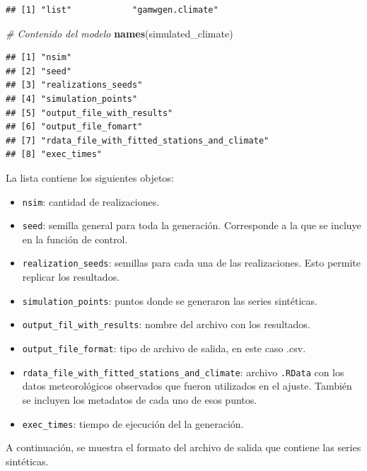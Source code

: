 \documentclass[
  12pt]{article}
\newenvironment{Shaded}{}{}
\newcommand{\CommentTok}[1]{\textcolor[rgb]{0.38,0.63,0.69}{\textit{#1}}}
\newcommand{\KeywordTok}[1]{\textcolor[rgb]{0.00,0.44,0.13}{\textbf{#1}}}
\newcommand{\NormalTok}[1]{#1}
\providecommand{\tightlist}{%
  \setlength{\itemsep}{0pt}\setlength{\parskip}{0pt}}
\begin{document}
\begin{verbatim}
## [1] "list"            "gamwgen.climate"
\end{verbatim}

\begin{Shaded}
\begin{Highlighting}[]
\CommentTok{# Contenido del modelo }
\KeywordTok{names}\NormalTok{(simulated_climate)}
\end{Highlighting}
\end{Shaded}

\begin{verbatim}
## [1] "nsim"                                       
## [2] "seed"                                       
## [3] "realizations_seeds"                         
## [4] "simulation_points"                          
## [5] "output_file_with_results"                   
## [6] "output_file_fomart"                         
## [7] "rdata_file_with_fitted_stations_and_climate"
## [8] "exec_times"
\end{verbatim}

La lista contiene los siguientes objetos:

\begin{itemize}
\tightlist
\item
  \texttt{nsim}: cantidad de realizaciones.
\item
  \texttt{seed}: semilla general para toda la generación. Corresponde a la que se incluye en la función de control.
\item
  \texttt{realization\_seeds}: semillas para cada una de las realizaciones. Esto permite replicar los resultados.
\item
  \texttt{simulation\_points}: puntos donde se generaron las series sintéticas.
\item
  \texttt{output\_fil\_with\_results}: nombre del archivo con los resultados.
\item
  \texttt{output\_file\_format}: tipo de archivo de salida, en este caso .csv.
\item
  \texttt{rdata\_file\_with\_fitted\_stations\_and\_climate}: archivo \texttt{.RData} con los datos meteorológicos observados que fueron utilizados en el ajuste. También se incluyen los metadatos de cada uno de esos puntos.
\item
  \texttt{exec\_times}: tiempo de ejecución del la generación.
\end{itemize}

A continuación, se muestra el formato del archivo de salida que contiene las series sintéticas.
\end{document}
